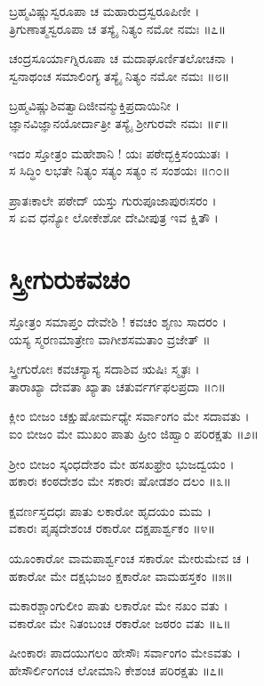 ಬ್ರಹ್ಮವಿಷ್ಣುಸ್ವರೂಪಾ ಚ ಮಹಾರುದ್ರಸ್ವರೂಪಿಣೀ ।\\
ತ್ರಿಗುಣಾತ್ಮಸ್ವರೂಪಾ ಚ ತಸ್ಯೈ ನಿತ್ಯಂ ನಮೋ ನಮಃ ॥೭॥

ಚಂದ್ರಸೂರ್ಯಾಗ್ನಿರೂಪಾ ಚ ಮದಾಘೂರ್ಣಿತಲೋಚನಾ ।\\
ಸ್ವನಾಥಂಚ ಸಮಾಲಿಂಗ್ಯ ತಸ್ಯೈ ನಿತ್ಯಂ ನಮೋ ನಮಃ ॥೮॥

ಬ್ರಹ್ಮವಿಷ್ಣುಶಿವತ್ವಾದಿಜೀವನ್ಮುಕ್ತಿಪ್ರದಾಯಿನೀ ।\\
ಜ್ಞಾನವಿಜ್ಞಾನಯೋರ್ದಾತ್ರೀ ತಸ್ಯೈ ಶ್ರೀಗುರವೇ ನಮಃ ॥೯॥

ಇದಂ ಸ್ತೋತ್ರಂ ಮಹೇಶಾನಿ ! ಯಃ ಪಠೇದ್ಭಕ್ತಿಸಂಯುತಃ ।\\
ಸ ಸಿದ್ಧಿಂ ಲಭತೇ ನಿತ್ಯಂ ಸತ್ಯಂ ಸತ್ಯಂ ನ ಸಂಶಯಃ ॥೧೦॥

ಪ್ರಾತಃಕಾಲೇ ಪಠೇದ್ ಯಸ್ತು ಗುರುಪೂಜಾಪುರಃಸರಂ ।\\
ಸ ಏವ ಧನ್ಯೋ ಲೋಕೇಶೋ ದೇವೀಪುತ್ರ ಇವ ಕ್ಷಿತೌ ।\\




\section{ಸ್ತ್ರೀಗುರುಕವಚಂ }

ಸ್ತೋತ್ರಂ ಸಮಾಪ್ತಂ ದೇವೇಶಿ ! ಕವಚಂ ಶೃಣು ಸಾದರಂ ।\\
ಯಸ್ಯ ಸ್ಮರಣಮಾತ್ರೇಣ ವಾಗೀಶಸಮತಾಂ ವ್ರಜೇತ್ ॥

ಸ್ತ್ರೀಗುರೋಃ ಕವಚಸ್ಯಾಸ್ಯ ಸದಾಶಿವ ಋಷಿಃ ಸ್ಮೃತಃ ।\\
ತಾರಾಖ್ಯಾ ದೇವತಾ ಖ್ಯಾತಾ ಚತುರ್ವರ್ಗಫಲಪ್ರದಾ ॥೧॥

ಕ್ಲೀಂ ಬೀಜಂ ಚಕ್ಷುಷೋರ್ಮಧ್ಯೇ ಸರ್ವಾಂಗಂ ಮೇ ಸದಾವತು ।\\
ಐಂ ಬೀಜಂ ಮೇ ಮುಖಂ ಪಾತು ಹ್ರೀಂ ಜಿಹ್ವಾಂ ಪರಿರಕ್ಷತು ॥೨॥

ಶ್ರೀಂ ಬೀಜಂ ಸ್ಕಂಧದೇಶಂ ಮೇ ಹಸಖಫ್ರೇಂ ಭುಜದ್ವಯಂ ।\\
ಹಕಾರಃ ಕಂಠದೇಶಂ ಮೇ ಸಕಾರಃ ಷೋಡಶಂ ದಲಂ ॥೩॥

ಕ್ಷವರ್ಣಸ್ತದಧಃ ಪಾತು ಲಕಾರೋ ಹೃದಯಂ ಮಮ ।\\
ವಕಾರಃ ಪೃಷ್ಠದೇಶಂಚ ರಕಾರೋ ದಕ್ಷಪಾರ್ಶ್ವಕಂ ॥೪॥

ಯೂಂಕಾರೋ ವಾಮಪಾರ್ಶ್ವಂಚ ಸಕಾರೋ ಮೇರುಮೇವ ಚ ।\\
ಹಕಾರೋ ಮೇ ದಕ್ಷಭುಜಂ ಕ್ಷಕಾರೋ ವಾಮಹಸ್ತಕಂ ॥೫॥

ಮಕಾರಶ್ಚಾಂಗುಲೀಂ ಪಾತು ಲಕಾರೋ ಮೇ ನಖಂ ವತು ।\\
ವಕಾರೋ ಮೇ ನಿತಂಬಂಚ ರಕಾರೋ ಜಠರಂ ವತು ॥೬॥

ಷೀಂಕಾರಃ ಪಾದಯುಗಲಂ ಹೇಸೌಃ ಸರ್ವಾಂಗಂ ಮೇಽವತು ।\\
ಹೇಸೌರ್ಲಿಂಗಂಚ ಲೋಮಾನಿ ಕೇಶಂಚ ಪರಿರಕ್ಷತು ॥೭॥

